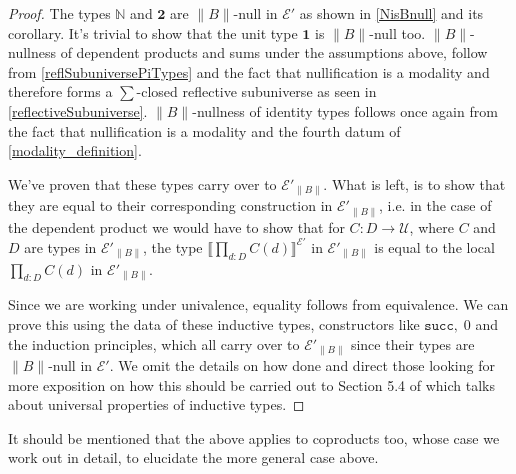 \documentclass[12pt]{report}
\theoremstyle{definition}
\begin{document}
\begin{proof}
The types $\mathbb{N}$ and $\mathbf{2}$ are $\lVert B \rVert$-null in $\mathcal{E}'$ as shown in \ref{NisBnull} and its corollary. 
It's trivial to show that the unit type $\mathbf{1}$ is $\lVert B \rVert$-null too. 
$\lVert B \rVert$-nullness of dependent products and sums under the assumptions above, follow from \ref{reflSubuniversePiTypes} and the fact that nullification is a modality and therefore forms a $\sum$-closed reflective subuniverse as seen in \ref{reflectiveSubuniverse}. 
$\lVert B \rVert$-nullness of identity types follows once again from the fact that nullification is a modality and the fourth datum of \ref{modality_definition}. 

We've proven that these types carry over to $\mathcal{E}'_{\lVert B \rVert}$. 
What is left, is to show that they are equal to their corresponding construction in $\mathcal{E}'_{\lVert B \rVert}$, i.e. in the case of the dependent product we would have to show that for $C : D \rightarrow \mathcal{U}$, where $C$ and $D$ are types in $\mathcal{E}'_{\lVert B \rVert}$, the type $\llbracket \prod_{d:D}C(d) \rrbracket^{\mathcal{E}'}$ in $\mathcal{E}'_{\lVert B \rVert}$ is equal to the local $\prod_{d:D}C(d)$ in $\mathcal{E}'_{\lVert B \rVert}$. 

Since we are working under univalence, equality follows from equivalence. 
We can prove this using the data of these inductive types, constructors like $\mathtt{succ},\;0$ and the induction principles, which all carry over to $\mathcal{E}'_{\lVert B \rVert}$ since their types are $\lVert B \rVert$-null in $\mathcal{E}'$. 
We omit the details on how done and direct those looking for more exposition on how this should be carried out to Section 5.4 of \cite{hottbook} which talks about universal properties of inductive types. 
\end{proof}
It should be mentioned that the above applies to coproducts too, whose case we work out in detail, to elucidate the more general case above. 
\end{document}
